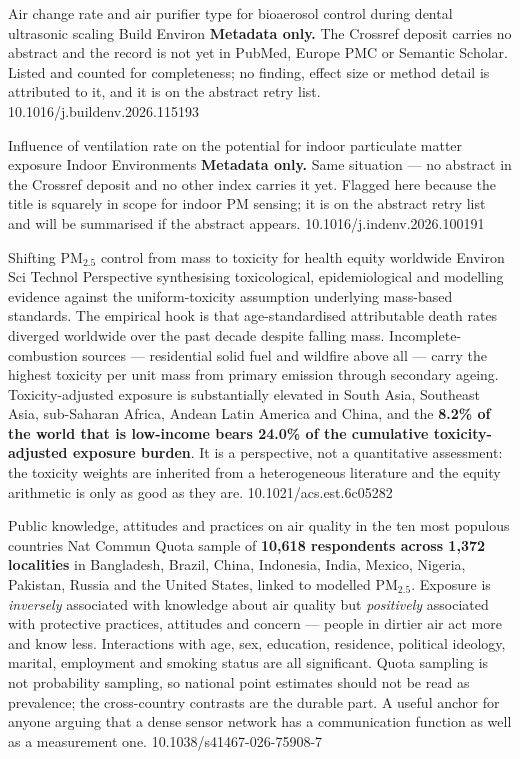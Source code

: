 \documentclass[10pt]{article}
\begin{document}
{Air change rate and air purifier type for bioaerosol control during dental ultrasonic
scaling}
{Build Environ}
{\textbf{Metadata only.} The Crossref deposit carries no abstract and the record is not
yet in PubMed, Europe PMC or Semantic Scholar. Listed and counted for completeness; no
finding, effect size or method detail is attributed to it, and it is on the abstract
retry list.}
{10.1016/j.buildenv.2026.115193}

{Influence of ventilation rate on the potential for indoor particulate matter exposure}
{Indoor Environments}
{\textbf{Metadata only.} Same situation --- no abstract in the Crossref deposit and no
other index carries it yet. Flagged here because the title is squarely in scope for
indoor PM sensing; it is on the abstract retry list and will be summarised if the
abstract appears.}
{10.1016/j.indenv.2026.100191}


{Shifting PM$_{2.5}$ control from mass to toxicity for health equity worldwide}
{Environ Sci Technol}
{Perspective synthesising toxicological, epidemiological and modelling evidence against
the uniform-toxicity assumption underlying mass-based standards. The empirical hook is
that age-standardised attributable death rates diverged worldwide over the past decade
despite falling mass. Incomplete-combustion sources --- residential solid fuel and
wildfire above all --- carry the highest toxicity per unit mass from primary emission
through secondary ageing. Toxicity-adjusted exposure is substantially elevated in South
Asia, Southeast Asia, sub-Saharan Africa, Andean Latin America and China, and the
\textbf{8.2\% of the world that is low-income bears 24.0\% of the cumulative
toxicity-adjusted exposure burden}. It is a perspective, not a quantitative assessment:
the toxicity weights are inherited from a heterogeneous literature and the equity
arithmetic is only as good as they are.}
{10.1021/acs.est.6c05282}

{Public knowledge, attitudes and practices on air quality in the ten most populous
countries}
{Nat Commun}
{Quota sample of \textbf{10{,}618 respondents across 1{,}372 localities} in Bangladesh,
Brazil, China, Indonesia, India, Mexico, Nigeria, Pakistan, Russia and the United States,
linked to modelled PM$_{2.5}$. Exposure is \emph{inversely} associated with knowledge
about air quality but \emph{positively} associated with protective practices, attitudes
and concern --- people in dirtier air act more and know less. Interactions with age, sex,
education, residence, political ideology, marital, employment and smoking status are all
significant. Quota sampling is not probability sampling, so national point estimates
should not be read as prevalence; the cross-country contrasts are the durable part. A
useful anchor for anyone arguing that a dense sensor network has a communication function
as well as a measurement one.}
{10.1038/s41467-026-75908-7}
\end{document}
